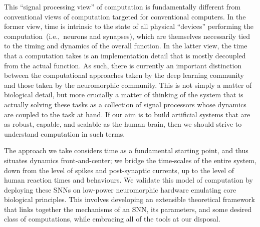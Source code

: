 This ``signal processing view'' of computation is fundamentally different from conventional views of computation targeted for conventional computers.
In the former view, time is intrinsic to the state of all physical ``devices'' performing the computation~(i.e.,~neurons and synapses), which are themselves necessarily tied to the timing and dynamics of the overall function.
In the latter view, the time that a computation takes is an implementation detail that is mostly decoupled from the actual function.
As such, there is currently an important distinction between the computational approaches taken by the deep learning community and those taken by the neuromorphic community.
This is not simply a matter of biological detail, but more crucially a matter of thinking of the system that is actually solving these tasks as a collection of signal processors whose dynamics are coupled to the task at hand.
If our aim is to build artificial systems that are as robust, capable, and scalable as the human brain, then we should strive to understand computation in such terms.

The approach we take considers time as a fundamental starting point, and thus situates dynamics front-and-center; we bridge the time-scales of the entire system, down from the level of spikes and post-synaptic currents, up to the level of human reaction times and behaviours. 
We validate this model of computation by deploying these SNNs on low-power neuromorphic hardware emulating core biological principles.
This involves developing an extensible theoretical framework that links together the mechanisms of an SNN, its parameters, and some desired class of computations, while embracing all of the tools at our disposal.


